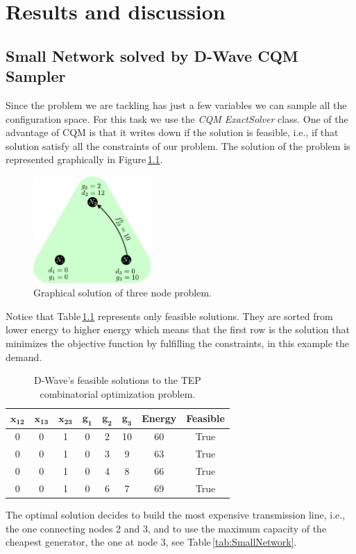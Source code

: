 
\chapter{Results and discussion} %

\label{Chapter5} %
\section{Small Network solved by D-Wave CQM Sampler}
Since the problem we are tackling has just a few variables we can sample all the configuration space. For this task we use the \textit{CQM ExactSolver} class. One of the advantage of CQM is that it writes down if the solution is feasible, i.e.,  if that solution satisfy all the constraints of our problem. The solution of the problem is represented graphically in Figure\,\ref{fig: Green_final}.
\begin{figure}[H]
  \begin{center}
\includegraphics[width=0.4\textwidth]{Figures/Green_Final.pdf}
  \end{center}
  \caption{Graphical solution of three node problem.}
  \label{fig: Green_final}
\end{figure}
Notice that Table\,\ref{tab:SmallNetworkResults} represents only feasible solutions. They are sorted from lower energy to higher energy which means that the first row is the solution that minimizes the objective function by fulfilling the constraints, in this example the demand.
 \begin{table}[H]
\centering
\begin{tabular}{ |c|c|c|c|c|c|c|c| }
  \hline			
  $\mathbf{x_{12}}$ & $\mathbf{x_{13}}$ & $\mathbf{x_{23}}$ & $\mathbf{g_{1}}$ & $\mathbf{g_{2}}$ & $\mathbf{g_{3}}$ & \textbf{Energy} & \textbf{Feasible} \\
  \hline
    0 & 0 & 1 & 0 & 2 & 10 & 60 & True \\
  \hline
    0 & 0 & 1 & 0 & 3 & 9 & 63 & True \\
  \hline
    0 & 0 & 1 & 0 & 4 & 8 & 66 & True \\
  \hline
    0 & 0 & 1 & 0 & 6 & 7 & 69 & True \\
  \hline
\end{tabular}
\caption{D-Wave's feasible solutions to the TEP combinatorial optimization problem.}
\label{tab:SmallNetworkResults}
\end{table}
The optimal solution decides to build the most expensive transmission line, i.e., the one connecting nodes 2 and 3, and to use the maximum capacity of the cheapest generator, the one at node 3, see Table\,\ref{tab:SmallNetwork}.
